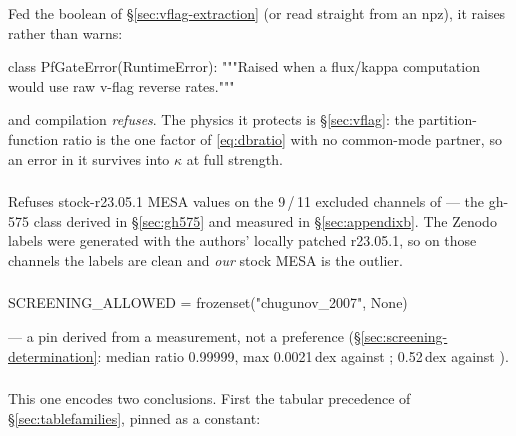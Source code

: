 Fed the  boolean of \S\ref{sec:vflag-extraction} (or
 read straight from an npz), it raises rather than
warns:

\begin{srclisting}
class PfGateError(RuntimeError):
    """Raised when a flux/kappa computation would use raw v-flag reverse rates."""
\end{srclisting}

and compilation \emph{refuses}. The physics it protects is
\S\ref{sec:vflag}: the partition-function ratio is the one factor of
\eqref{eq:dbratio} with no common-mode partner, so an error in it survives into
$\kappa$ at full strength.

\subsubsection{\texorpdfstring{}{assert appendixb routing}}
\label{sec:guard-appendixb}

Refuses stock-r23.05.1 MESA values on the 9\,/\,11 excluded channels of
 --- the gh-575 class derived in
\S\ref{sec:gh575} and measured in \S\ref{sec:appendixb}. The Zenodo labels were
generated with the authors' locally patched r23.05.1, so on those channels the
labels are clean and \emph{our} stock MESA is the outlier.

\subsubsection{\texorpdfstring{}{assert screening allowed}}
\label{sec:guard-screening}

\begin{srclisting}
SCREENING_ALLOWED = frozenset({"chugunov_2007", None})
\end{srclisting}

--- a pin derived from a measurement, not a preference
(\S\ref{sec:screening-determination}: median ratio 0.99999, max 0.0021\,dex
against ; 0.52\,dex against ).

\subsubsection{\texorpdfstring{}{assert reconciled build}}
\label{sec:guard-reconciled}

This one encodes two conclusions. First the tabular precedence of
\S\ref{sec:tablefamilies}, pinned as a constant:

